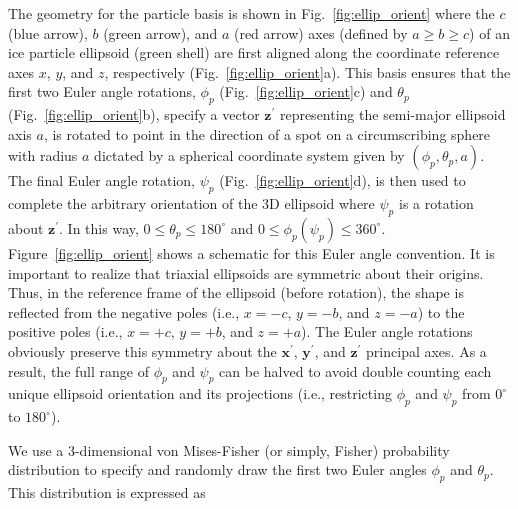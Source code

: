 \documentclass[amt, manuscript]{copernicus}
\begin{document}
The geometry for the particle basis is shown in Fig.~\ref{fig:ellip_orient} where the $c$ (blue arrow), $b$ (green arrow), and $a$ (red arrow) axes (defined by $a\geq b \geq c$) of an ice particle ellipsoid (green shell) are first aligned along the coordinate reference axes $x$, $y$, and $z$, respectively (Fig.~\ref{fig:ellip_orient}a). This basis ensures that the first two Euler angle rotations, $\phi_p$ (Fig.~\ref{fig:ellip_orient}c) and $\theta_p$ (Fig.~\ref{fig:ellip_orient}b), specify a vector $\mathbf{z^{\prime}}$ representing the semi-major ellipsoid axis $a$, is rotated to point in the direction of a spot on a circumscribing sphere with radius $a$ dictated by a spherical coordinate system given by $(\phi_p,\theta_p,a)$. The final Euler angle rotation, $\psi_p$ (Fig.~\ref{fig:ellip_orient}d), is then used to complete the arbitrary orientation of the 3D ellipsoid where $\psi_p$ is a rotation about $\mathbf{z^{\prime}}$. In this way, $0\leq \theta_p \leq 180^{\circ}$ and $0 \leq \phi_p (\psi_p) \leq 360^{\circ}$. Figure~\ref{fig:ellip_orient} shows a schematic for this Euler angle convention. It is important to realize that triaxial ellipsoids are symmetric about their origins. Thus, in the reference frame of the ellipsoid (before rotation), the shape is reflected from the negative poles (i.e., $x=-c$, $y=-b$, and $z=-a$) to the positive poles (i.e., $x=+c$, $y=+b$, and $z=+a$). The Euler angle rotations obviously preserve this symmetry about the $\mathbf{x^{\prime}}$, $\mathbf{y^{\prime}}$, and $\mathbf{z^{\prime}}$ principal axes. As a result, the full range of $\phi_p$ and $\psi_p$ can be halved to avoid double counting each unique ellipsoid orientation and its projections (i.e., restricting $\phi_p$ and $\psi_p$ from $0^{\circ}$ to $180^{\circ}$). 



 We use a 3-dimensional von Mises-Fisher (or simply, Fisher) probability distribution to specify and randomly draw the first two Euler angles $\phi_p$ and $\theta_p$. This distribution is expressed as
\end{document}
